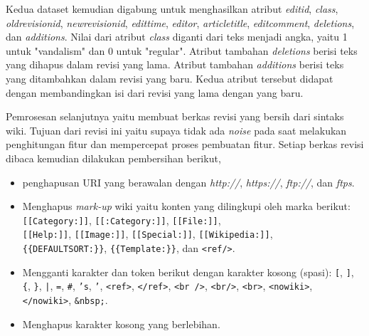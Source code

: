 \newpage
Kedua dataset kemudian digabung untuk menghasilkan atribut \textit{editid},
\textit{class}, \textit{oldrevisionid}, \textit{newrevisionid},
\textit{edittime}, \textit{editor}, \textit{articletitle},
\textit{editcomment}, \textit{deletions}, dan \textit{additions}.
Nilai dari atribut \textit{class} diganti dari teks menjadi angka, yaitu 1
untuk "vandalism" dan 0 untuk "regular".
Atribut tambahan \textit{deletions} berisi teks yang dihapus dalam revisi yang
lama.
Atribut tambahan \textit{additions} berisi teks yang ditambahkan dalam revisi
yang baru.
Kedua atribut tersebut didapat dengan membandingkan isi dari revisi yang lama
dengan yang baru.

Pemrosesan selanjutnya yaitu membuat berkas revisi yang bersih dari sintaks
wiki.
Tujuan dari revisi ini yaitu supaya tidak ada \textit{noise} pada saat
melakukan penghitungan fitur dan mempercepat proses pembuatan fitur.
Setiap berkas revisi dibaca kemudian dilakukan pembersihan berikut,

\begin{itemize}
\item penghapusan URI yang berawalan dengan
\textit{http://}, \textit{https://}, \textit{ftp://}, dan \textit{ftps}.
\item Menghapus \textit{mark-up} wiki yaitu konten yang dilingkupi oleh marka
berikut:
\texttt{[[Category:]]}, \texttt{[[:Category:]]}, \texttt{[[File:]]}, \\
\texttt{[[Help:]]}, \texttt{[[Image:]]}, \texttt{[[Special:]]},
\texttt{[[Wikipedia:]]}, \\
\texttt{\{\{DEFAULTSORT:\}\}}, \texttt{\{\{Template:\}\}}, dan \texttt{<ref/>}.
\item Mengganti karakter dan token berikut dengan karakter kosong (spasi):
\texttt{[}, \texttt{]}, \texttt{\{}, \texttt{\}}, \texttt{|}, \texttt{=},
\texttt{\#}, \texttt{'s}, \texttt{'}, \texttt{<ref>}, \texttt{</ref>},
\texttt{<br />}, \texttt{<br/>}, \texttt{<br>}, \texttt{<nowiki>},
\texttt{</nowiki>}, \texttt{\&nbsp;}.
\item Menghapus karakter kosong yang berlebihan.
\end{itemize}
